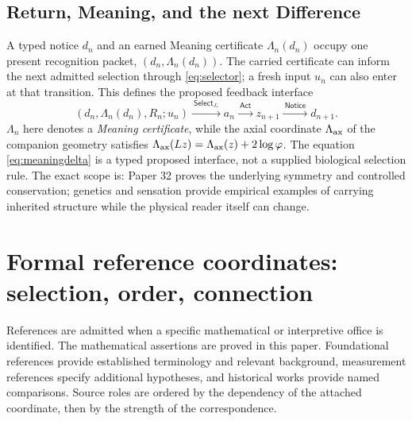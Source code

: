\documentclass[10pt,letterpaper]{article}
\theoremstyle{definition}\newtheorem{definition}[theorem]{Definition}
\newcommand{\ph}{\varphi}
\begin{document}
\subsection*{Return, Meaning, and the next Difference}
A typed notice $d_n$ and an earned Meaning certificate $\Lambda_n(d_n)$ occupy one present recognition packet, $(d_n,\Lambda_n(d_n))$. The carried certificate can inform the next admitted selection through \eqref{eq:selector}; a fresh input $u_n$ can also enter at that transition. This defines the proposed feedback interface
\begin{equation}\label{eq:meaningdelta}
 (d_n,\Lambda_n(d_n),R_n;u_n)
 \xrightarrow{\ \mathsf{Select}_{J_*}\ } a_n
 \xrightarrow{\ \mathsf{Act}\ } z_{n+1}
 \xrightarrow{\ \mathsf{Notice}\ } d_{n+1}.
\end{equation}
$\Lambda_n$ here denotes a \emph{Meaning certificate}, while the axial coordinate $\Lambda_{\rm ax}$ of the companion geometry satisfies $\Lambda_{\rm ax}(Lz)=\Lambda_{\rm ax}(z)+2\log\ph$. The equation \eqref{eq:meaningdelta} is a typed proposed interface, not a supplied biological selection rule. The exact scope is: Paper 32 proves the underlying symmetry and controlled conservation; genetics and sensation provide empirical examples of carrying inherited structure while the physical reader itself can change.

\section{Formal reference coordinates: selection, order, connection}\label{sec:refs}
References are admitted when a specific mathematical or interpretive office is identified. The mathematical assertions are proved in this paper. Foundational references provide established terminology and relevant background, measurement references specify additional hypotheses, and historical works provide named comparisons. Source roles are ordered by the dependency of the attached coordinate, then by the strength of the correspondence.
\end{document}
